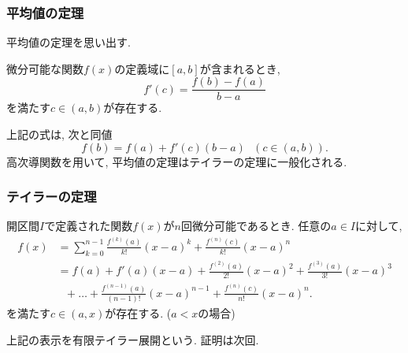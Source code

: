 \begin{frame}

\frametitle{平均値の定理}


平均値の定理を思い出す. 
\begin{Thm}[平均値の定理]
微分可能な関数$f(x)$の定義域に$[a,b]$が含まれるとき, %
$$
f'(c)=\frac{f(b)-f(a)}{b-a}
$$
を満たす$c \in (a,b)$が存在する. 
\end{Thm}

上記の式は, 次と同値
$$
f(b)=f(a)+f'(c)(b-a) \ \ \ (c \in (a,b)). 
$$
高次導関数を用いて, 平均値の定理はテイラーの定理に一般化される. 

\end{frame}







\begin{frame}
\frametitle{テイラーの定理}


\begin{Thm}[テイラーの定理] \label{テイラー}
開区間$I$で定義された関数$f(x)$が$n$回微分可能であるとき. 
任意の$a \in I$に対して, 
 \begin{align*}
f(x) & = \sum_{k=0}^{n-1}\frac{f^{(k)}(a)}{k!}(x-a)^k + \frac{f^{(n)}(c)}{k!}(x-a)^n \\
& =  f(a)+ f'(a)(x-a) + \frac{f^{(2)}(a)}{2!}(x-a)^2  + \frac{f^{(3)}(a)}{3!}(x-a)^3 \\
& \ \ \ + \dots + \frac{f^{(n-1)}(a)}{(n-1)!}(x-a)^{n-1}+\frac{f^{(n)}(c)}{n!}(x-a)^n . 
\end{align*}
を満たす$c \in (a,x)$が存在する. ($a<x$の場合) 
\end{Thm}
上記の表示を有限テイラー展開という. 
証明は次回. 


\end{frame}








